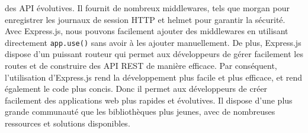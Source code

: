 \documentclass[12pt]{article}
\begin{document}
\begin{itemize}
                  des API évolutives. Il fournit de nombreux middlewares, tels que
                  morgan \cite{morgan} pour enregistrer les
                  journaux de session HTTP et helmet
                  \cite{helmet} pour garantir la sécurité.
                  Avec Express.js, nous pouvons facilement ajouter des middlewares en
                  utilisant directement \texttt{app.use()} sans avoir à les ajouter
                  manuellement. De plus, Express.js dispose d'un puissant routeur qui
                  permet aux développeurs de gérer facilement les routes et de
                  construire des API REST de manière efficace. Par conséquent,
                  l'utilisation d'Express.js rend la développement plus facile et plus
                  efficace, et rend également le code plus concis. Donc il permet aux
                  développeurs de créer facilement des applications web plus rapides et
                  évolutives. Il dispose d'une plus grande communauté que les
                  bibliothèques plus jeunes, avec de nombreuses ressources et solutions
                  disponibles.
      \end{itemize}

      \newpage
\end{document}
